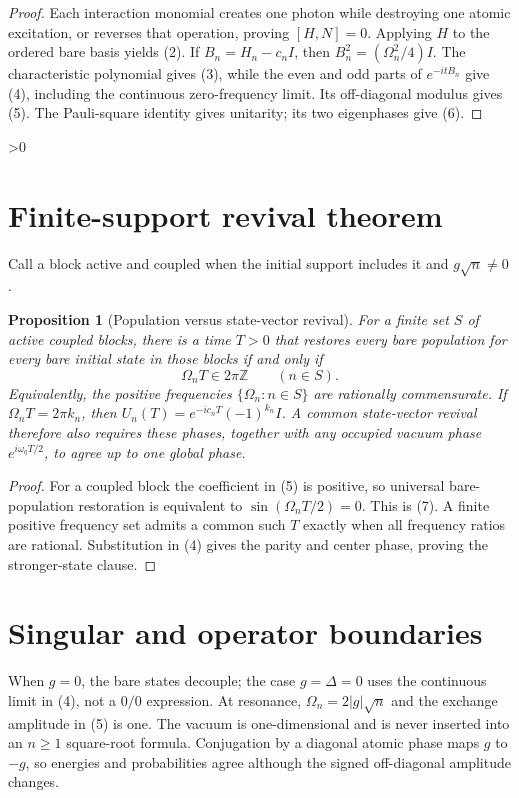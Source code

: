 \documentclass[11pt]{article}
\newtheorem{proposition}{Proposition}
\begin{document}
\begin{proof}
Each interaction monomial creates one photon while destroying one atomic
excitation, or reverses that operation, proving $[H,N]=0$.  Applying $H$ to
the ordered bare basis yields (2).  If
$B_n=H_n-c_nI$, then $B_n^2=(\Omega_n^2/4)I$.  The characteristic polynomial
gives (3), while the even and odd parts of $e^{-itB_n}$ give (4), including
the continuous zero-frequency limit.  Its off-diagonal modulus gives (5).
The Pauli-square identity gives unitarity; its two eigenphases give (6).
\end{proof}

\ifnum\CRevisionRound>0
\section{Finite-support revival theorem}
Call a block active and coupled when the initial support includes it and
$g\sqrt n\ne0$.

\begin{proposition}[Population versus state-vector revival]\label{prop:rev}
For a finite set $S$ of active coupled blocks, there is a time $T>0$ that
restores every bare population for every bare initial state in those blocks
if and only if
\[
 \Omega_nT\in2\pi\mathbb Z\qquad(n\in S).               \tag{7}
\]
Equivalently, the positive frequencies $\{\Omega_n:n\in S\}$ are rationally
commensurate.  If $\Omega_nT=2\pi k_n$, then
$U_n(T)=e^{-ic_nT}(-1)^{k_n}I$.  A common state-vector revival therefore also
requires these phases, together with any occupied vacuum phase
$e^{i\omega_qT/2}$, to agree up to one global phase.
\end{proposition}

\begin{proof}
For a coupled block the coefficient in (5) is positive, so universal bare-
population restoration is equivalent to
$\sin(\Omega_nT/2)=0$.  This is (7).  A finite positive frequency set admits
a common such $T$ exactly when all frequency ratios are rational.  Substitution
in (4) gives the parity and center phase, proving the stronger-state clause.
\end{proof}

\section{Singular and operator boundaries}
When $g=0$, the bare states decouple; the case $g=\Delta=0$ uses the continuous
limit in (4), not a $0/0$ expression.  At resonance,
$\Omega_n=2|g|\sqrt n$ and the exchange amplitude in (5) is one.  The vacuum
is one-dimensional and is never inserted into an $n\ge1$ square-root formula.
Conjugation by a diagonal atomic phase maps $g$ to $-g$, so energies and
probabilities agree although the signed off-diagonal amplitude changes.
\end{document}
